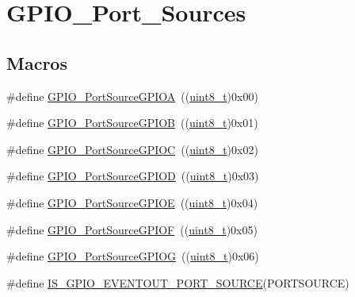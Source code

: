 \hypertarget{group___g_p_i_o___port___sources}{}\section{G\+P\+I\+O\+\_\+\+Port\+\_\+\+Sources}
\label{group___g_p_i_o___port___sources}
\subsection*{Macros}
\begin{DoxyCompactItemize}
\item 
\#define \hyperlink{group___g_p_i_o___port___sources_gacddaa6b6535b5de02ba99e75111c4924}{G\+P\+I\+O\+\_\+\+Port\+Source\+G\+P\+I\+OA}~((\hyperlink{_p_e___types_8h_aba7bc1797add20fe3efdf37ced1182c5}{uint8\+\_\+t})0x00)
\item 
\#define \hyperlink{group___g_p_i_o___port___sources_ga20a7ea6589564aee1fd5344bf01e65e5}{G\+P\+I\+O\+\_\+\+Port\+Source\+G\+P\+I\+OB}~((\hyperlink{_p_e___types_8h_aba7bc1797add20fe3efdf37ced1182c5}{uint8\+\_\+t})0x01)
\item 
\#define \hyperlink{group___g_p_i_o___port___sources_ga7511e96933d503ecf7128ebaff613e7e}{G\+P\+I\+O\+\_\+\+Port\+Source\+G\+P\+I\+OC}~((\hyperlink{_p_e___types_8h_aba7bc1797add20fe3efdf37ced1182c5}{uint8\+\_\+t})0x02)
\item 
\#define \hyperlink{group___g_p_i_o___port___sources_ga68309c29660ae328d3699781520e3d21}{G\+P\+I\+O\+\_\+\+Port\+Source\+G\+P\+I\+OD}~((\hyperlink{_p_e___types_8h_aba7bc1797add20fe3efdf37ced1182c5}{uint8\+\_\+t})0x03)
\item 
\#define \hyperlink{group___g_p_i_o___port___sources_ga8b849f35292768d73a9f9a76cac96456}{G\+P\+I\+O\+\_\+\+Port\+Source\+G\+P\+I\+OE}~((\hyperlink{_p_e___types_8h_aba7bc1797add20fe3efdf37ced1182c5}{uint8\+\_\+t})0x04)
\item 
\#define \hyperlink{group___g_p_i_o___port___sources_ga19dfaf7ac2cdf66b697bcd8665b860ef}{G\+P\+I\+O\+\_\+\+Port\+Source\+G\+P\+I\+OF}~((\hyperlink{_p_e___types_8h_aba7bc1797add20fe3efdf37ced1182c5}{uint8\+\_\+t})0x05)
\item 
\#define \hyperlink{group___g_p_i_o___port___sources_ga43af0aa9b42aefa2c7d24dfa9889040b}{G\+P\+I\+O\+\_\+\+Port\+Source\+G\+P\+I\+OG}~((\hyperlink{_p_e___types_8h_aba7bc1797add20fe3efdf37ced1182c5}{uint8\+\_\+t})0x06)
\item 
\#define \hyperlink{group___g_p_i_o___port___sources_ga40d86e5f9f013777038932f57bc6bbef}{I\+S\+\_\+\+G\+P\+I\+O\+\_\+\+E\+V\+E\+N\+T\+O\+U\+T\+\_\+\+P\+O\+R\+T\+\_\+\+S\+O\+U\+R\+CE}(P\+O\+R\+T\+S\+O\+U\+R\+CE)

\end{DoxyCompactItemize}
